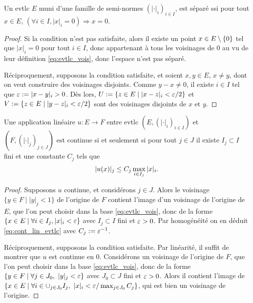 \begin{lemma}
\label{lem:evtlc_separe}
%
	Un evtlc $E$ muni d'une famille de semi-normes $(|\cdot|_i)_{i \in I}$, est séparé ssi pour tout $x \in E$, $(\forall i \in I, |x|_i = 0 ) \Rightarrow x=0$.
\end{lemma}

\begin{proof}
	Si la condition n'est pas satisfaite, alors il existe un point $x\in E\setminus\{0\}$ tel que $|x|_i=0$ pour tout $i \in I$, donc appartenant à tous les voisinages de $0$ au vu de leur définition \eqref{eq:evtlc_vois}, donc l'espace n'est pas séparé.

	Réciproquement, supposons la condition satisfaite, et soient $x,y \in E$, $x \neq y$, dont on veut construire des voisinages disjoints. Comme $y-x \neq 0$, il existe $i \in I$ tel que $\varepsilon := |x-y|_i >0$. Dès lors, $U := \{z \in E\mid |x-z|_i < \varepsilon/2\}$ et $V := \{z \in E\mid |y-z|_i < \varepsilon/2\}$ sont des voisinages disjoints de $x$ et $y$. 
\end{proof}


\begin{lemma}
\label{lem:evtlcLinCont}
%
Une application linéaire $u : E \to F$ entre evtlc $(E,(|\cdot|_i)_{i \in I})$ et $(F,(|\cdot|_j)_{j \in J})$ est continue si et seulement si pour tout $j \in J$ il existe $I_j \subset I$ fini et une constante $C_j$ tels que 
\begin{equation}
\label{eq:cont_lin_evtlc}
	|u(x)|_j \leq C_j \max_{i \in I_j} |x|_i.
\leancheck{eq:cont_lin_evtlc}%
\end{equation}	
\end{lemma}

\begin{proof}
	Supposons $u$ continue, et considérons $j \in J$. Alors le voisinage $\{y \in F \mid |y|_j < 1\}$ de l'origine de $F$ contient l'image d'un voisinage de l'origine de $E$, que l'on peut choisir dans la base \eqref{eq:evtlc_vois}, donc de la forme $\{x \in E \mid \forall i \in I_j, |x|_i < \varepsilon\}$ avec $I_j \subset I$ fini et $\varepsilon > 0$. 
	Par homogénéité on en déduit \eqref{eq:cont_lin_evtlc} avec $C_j := \varepsilon^{-1}$. 
	
	Réciproquement, supposons la condition satisfaite. Par linéarité, il suffit de montrer que $u$ est continue en $0$. Considérons un voisinage de l'origine de $F$, que l'on peut choisir dans la base \eqref{eq:evtlc_vois}, donc de la forme $\{y \in F \mid \forall j \in J_0,\ |y|_j < \varepsilon\}$ avec $J_0 \subset J$ fini et $\varepsilon>0$. Alors il contient l'image de $\{x \in E \mid \forall i \in \cup_{j \in J_0} I_j,\ |x|_i < \varepsilon/\max_{j \in J_0} C_j\}$, qui est bien un voisinage de l'origine. 
\end{proof}


